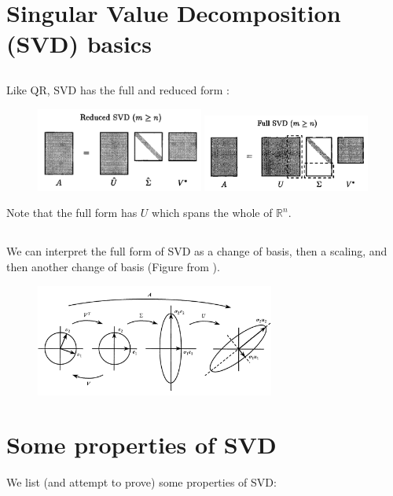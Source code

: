 \documentclass[11pt,letterpaper]{article}
\begin{document}
\section{Singular Value Decomposition (SVD) basics}
\subsection{}
Like QR, SVD has the full and reduced form \cite{TrefethenBau_97}:
\begin{figure}[H]
    \centering
    \includegraphics[width = 0.49\textwidth]{figs/TB_reducedSVD}
    \includegraphics[width = 0.49\textwidth]{figs/TB_fullSVD}
\end{figure}
Note that the full form has $U$ which spans the whole of $\mathbb{R}^n$.

\subsection{}
We can interpret the full form of SVD as a change of basis, then a scaling, and then another change of basis (Figure from \cite{Strang_93}).
\begin{figure}[H]
    \centering
    \includegraphics[width = 0.7\textwidth]{figs/strang_SVD}
\end{figure}

\section{Some properties of SVD}
We list (and attempt to prove) some properties of SVD:
\end{document}
